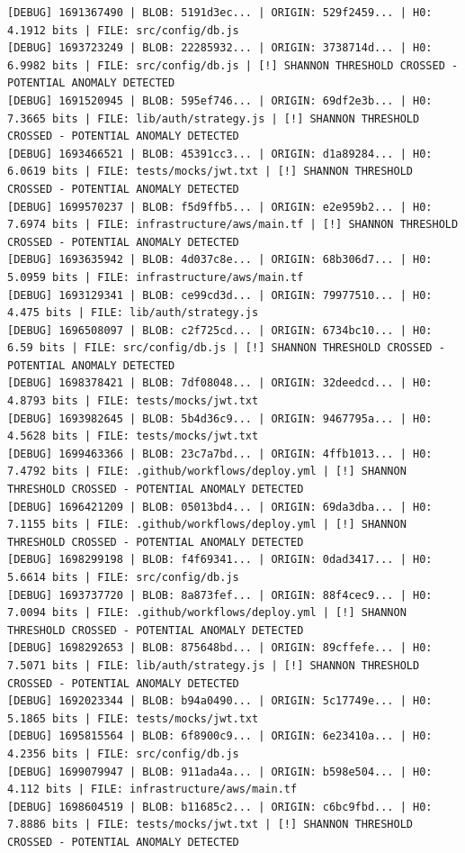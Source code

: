 \documentclass[12pt, a4paper, oneside]{report}
\begin{document}
\begin{lstlisting}[basicstyle=\tiny\ttfamily]
[DEBUG] 1691367490 | BLOB: 5191d3ec... | ORIGIN: 529f2459... | H0: 4.1912 bits | FILE: src/config/db.js
[DEBUG] 1693723249 | BLOB: 22285932... | ORIGIN: 3738714d... | H0: 6.9982 bits | FILE: src/config/db.js | [!] SHANNON THRESHOLD CROSSED - POTENTIAL ANOMALY DETECTED
[DEBUG] 1691520945 | BLOB: 595ef746... | ORIGIN: 69df2e3b... | H0: 7.3665 bits | FILE: lib/auth/strategy.js | [!] SHANNON THRESHOLD CROSSED - POTENTIAL ANOMALY DETECTED
[DEBUG] 1693466521 | BLOB: 45391cc3... | ORIGIN: d1a89284... | H0: 6.0619 bits | FILE: tests/mocks/jwt.txt | [!] SHANNON THRESHOLD CROSSED - POTENTIAL ANOMALY DETECTED
[DEBUG] 1699570237 | BLOB: f5d9ffb5... | ORIGIN: e2e959b2... | H0: 7.6974 bits | FILE: infrastructure/aws/main.tf | [!] SHANNON THRESHOLD CROSSED - POTENTIAL ANOMALY DETECTED
[DEBUG] 1693635942 | BLOB: 4d037c8e... | ORIGIN: 68b306d7... | H0: 5.0959 bits | FILE: infrastructure/aws/main.tf
[DEBUG] 1693129341 | BLOB: ce99cd3d... | ORIGIN: 79977510... | H0: 4.475 bits | FILE: lib/auth/strategy.js
[DEBUG] 1696508097 | BLOB: c2f725cd... | ORIGIN: 6734bc10... | H0: 6.59 bits | FILE: src/config/db.js | [!] SHANNON THRESHOLD CROSSED - POTENTIAL ANOMALY DETECTED
[DEBUG] 1698378421 | BLOB: 7df08048... | ORIGIN: 32deedcd... | H0: 4.8793 bits | FILE: tests/mocks/jwt.txt
[DEBUG] 1693982645 | BLOB: 5b4d36c9... | ORIGIN: 9467795a... | H0: 4.5628 bits | FILE: tests/mocks/jwt.txt
[DEBUG] 1699463366 | BLOB: 23c7a7bd... | ORIGIN: 4ffb1013... | H0: 7.4792 bits | FILE: .github/workflows/deploy.yml | [!] SHANNON THRESHOLD CROSSED - POTENTIAL ANOMALY DETECTED
[DEBUG] 1696421209 | BLOB: 05013bd4... | ORIGIN: 69da3dba... | H0: 7.1155 bits | FILE: .github/workflows/deploy.yml | [!] SHANNON THRESHOLD CROSSED - POTENTIAL ANOMALY DETECTED
[DEBUG] 1698299198 | BLOB: f4f69341... | ORIGIN: 0dad3417... | H0: 5.6614 bits | FILE: src/config/db.js
[DEBUG] 1693737720 | BLOB: 8a873fef... | ORIGIN: 88f4cec9... | H0: 7.0094 bits | FILE: .github/workflows/deploy.yml | [!] SHANNON THRESHOLD CROSSED - POTENTIAL ANOMALY DETECTED
[DEBUG] 1698292653 | BLOB: 875648bd... | ORIGIN: 89cffefe... | H0: 7.5071 bits | FILE: lib/auth/strategy.js | [!] SHANNON THRESHOLD CROSSED - POTENTIAL ANOMALY DETECTED
[DEBUG] 1692023344 | BLOB: b94a0490... | ORIGIN: 5c17749e... | H0: 5.1865 bits | FILE: tests/mocks/jwt.txt
[DEBUG] 1695815564 | BLOB: 6f8900c9... | ORIGIN: 6e23410a... | H0: 4.2356 bits | FILE: src/config/db.js
[DEBUG] 1699079947 | BLOB: 911ada4a... | ORIGIN: b598e504... | H0: 4.112 bits | FILE: infrastructure/aws/main.tf
[DEBUG] 1698604519 | BLOB: b11685c2... | ORIGIN: c6bc9fbd... | H0: 7.8886 bits | FILE: tests/mocks/jwt.txt | [!] SHANNON THRESHOLD CROSSED - POTENTIAL ANOMALY DETECTED

\end{lstlisting}
\end{document}
